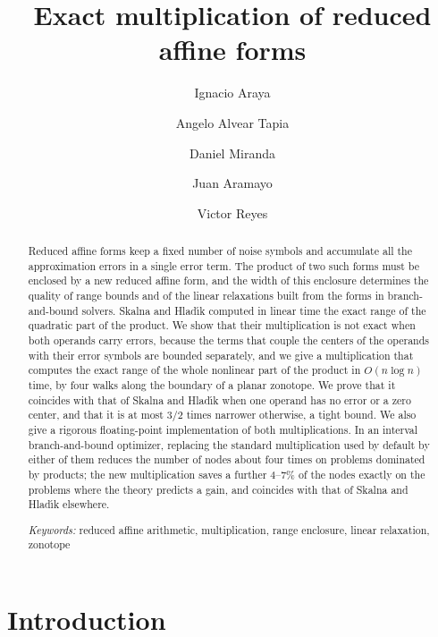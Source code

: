 \documentclass[10pt]{article}
\title{Exact multiplication of reduced affine forms}
\author{Ignacio Araya \and Angelo Alvear Tapia \and Daniel Miranda \and Juan Aramayo \and Victor Reyes}
\date{}
\theoremstyle{definition}
\begin{document}
\maketitle

\begin{abstract}
Reduced affine forms keep a fixed number of noise symbols and accumulate all the approximation errors in a single error term. The product of two such forms must be enclosed by a new reduced affine form, and the width of this enclosure determines the quality of range bounds and of the linear relaxations built from the forms in branch-and-bound solvers. Skalna and Hlad\'{\i}k computed in linear time the exact range of the quadratic part of the product. We show that their multiplication is not exact when both operands carry errors, because the terms that couple the centers of the operands with their error symbols are bounded separately, and we give a multiplication that computes the exact range of the whole nonlinear part of the product in $O(n\log n)$ time, by four walks along the boundary of a planar zonotope. We prove that it coincides with that of Skalna and Hlad\'{\i}k when one operand has no error or a zero center, and that it is at most $3/2$ times narrower otherwise, a tight bound. We also give a rigorous floating-point implementation of both multiplications. In an interval branch-and-bound optimizer, replacing the standard multiplication used by default by either of them reduces the number of nodes about four times on problems dominated by products; the new multiplication saves a further 4--7\% of the nodes exactly on the problems where the theory predicts a gain, and coincides with that of Skalna and Hlad\'{\i}k elsewhere.

\medskip\noindent
\textit{Keywords:} reduced affine arithmetic, multiplication, range enclosure, linear relaxation, zonotope
\end{abstract}

\section{Introduction}
\end{document}
